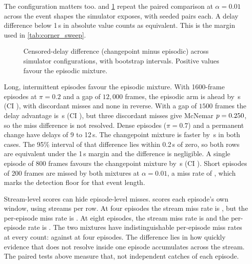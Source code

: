 The configuration matters too.  and \cref{fig:corner}
repeat the paired comparison at $\alpha=0.01$ across the event shapes the
simulator exposes, with \CornerReps{} seeded pairs each. A delay difference below 1\,s in absolute
value counts as equivalent. This is the margin used in \cref{tab:corner_sweep}.

\begin{figure}[t]
  \centering
  \caption{Censored-delay difference (changepoint minus episodic) across simulator
  configurations, with bootstrap intervals. Positive values favour the episodic
  mixture.}
  \label{fig:corner}
\end{figure}


Long, intermittent episodes favour the episodic mixture. With 1600-frame episodes
at $\pi=0.2$ and a gap of $12{,}000$ frames, the episodic arm is ahead by
\CornerLongGapDiff\,s (CI \CornerLongGapCi), with \CornerLongGapEpiOnly{}
discordant misses and none in reverse. With a gap of $1500$ frames the delay
advantage is \CornerShortGapDiff\,s (CI \CornerShortGapCi), but three discordant
misses give McNemar $p=0.250$, so the miss difference is not resolved.
Dense episodes ($\pi=0.7$) and a permanent change have delays of 9 to 12\,s. The
changepoint mixture is faster by \CornerDenseAbsDiff\,s in both cases. The 95\%
interval of that difference lies within 0.2\,s of zero, so both rows are equivalent
under the 1\,s margin and the difference is negligible. A single episode of 800
frames favours the changepoint mixture by \CornerSingleAbsDiff\,s (CI
\CornerSingleCi). Short episodes of 200 frames are missed by both mixtures at
$\alpha=0.01$, a miss rate of \CornerFloorMiss{}, which marks the detection floor
for that event length.

\label{sec:per-episode}
Stream-level scores can hide episode-level misses.  scores
each episode's own window, using \ExpTenReps{} streams per row. At four episodes the
stream miss rate is \PerEpiMidEpiStreamMiss{}, but the per-episode miss rate is
\PerEpiMidEpiMiss{}. At eight episodes, the stream miss rate is
\PerEpiManyEpiStreamMiss{} and the per-episode rate is \PerEpiManyEpiMiss{}.
The two mixtures have indistinguishable per-episode miss rates at every count:
\PerEpiMidEpiMiss{} against \PerEpiMidCpMiss{} at four episodes. The difference
lies in how quickly evidence that does not resolve inside one episode
accumulates across the stream. The paired tests above measure that, not
independent catches of each episode.

